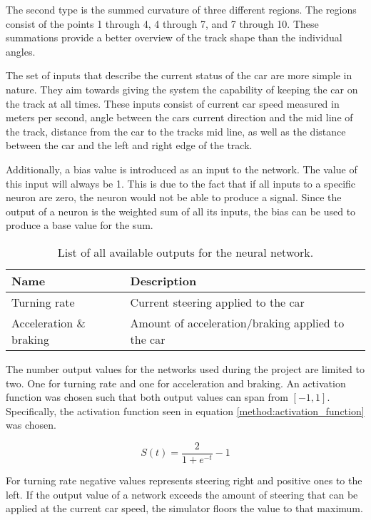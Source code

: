The second type is the summed curvature of three different regions. The regions consist of the points 1 through 4, 4 through 7, and 7 through 10. These summations provide a better overview of the track shape than the individual angles. 

The set of inputs that describe the current status of the car are more simple in nature. They aim towards giving the system the capability of keeping the car on the track at all times. These inputs consist of current car speed measured in meters per second, angle between the cars current direction and the mid line of the track, distance from the car to the tracks mid line, as well as the distance between the car and the left and right edge of the track.

Additionally, a bias value is introduced as an input to the network. The value of this input will always be 1. This is due to the fact that if all inputs to a specific neuron are zero, the neuron would not be able to produce a signal. Since the output of a neuron is the weighted sum of all its inputs, the bias can be used to produce a base value for the sum. 

\begin{table}[h!] 
  \centering
  \begin{tabular}{ll}
    \toprule
    Name & Description\\
    \midrule
    Turning rate & Current steering applied to the car \\
    Acceleration \& braking & Amount of acceleration/braking applied to the car \\
    \bottomrule
  \end{tabular}
  \caption{List of all available outputs for the neural network.}
  \label{tab:output_table}
\end{table}

\noindent
The number output values for the networks used during the project are limited to two. One for turning rate and one for acceleration and braking. An activation function was chosen such that both output values can span from $[-1,1]$. Specifically, the activation function seen in equation \ref{method:activation_function} was chosen.

\begin{equation}
\label{method:activation_function}
    S(t) = \frac{2}{1 + e^{-t}} - 1
\end{equation}

\noindent
For turning rate negative values represents steering right and positive ones to the left. If the output value of a network exceeds the amount of steering that can be applied at the current car speed, the simulator floors the value to that maximum.

